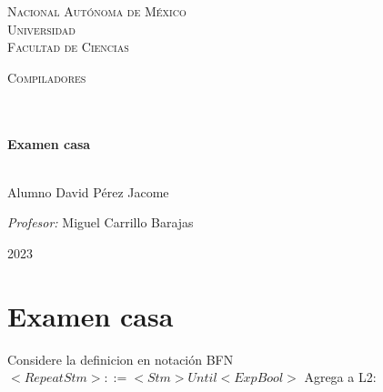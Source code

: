 \documentclass[14pt]{book}
\begin{document}
\begin{center}
\begin{minipage}{0.48\textwidth}
\begin{flushright}
    \end{flushright}
  \end{minipage}
  \vspace*{-1.5cm}
  \textsc{\huge Nacional Autónoma de México \\ \vspace{-4px} Universidad }\\[2cm]
  \textsc{\LARGE Facultad de Ciencias}\\[1.5cm]
  \begin{minipage}{0.9\textwidth}
    \begin{center}
      \textsc{\LARGE Compiladores}
    \end{center}
  \end{minipage}\\[0.5cm]
  \vspace*{1cm}
  \HRule \\[0.4cm]
  { \huge \bfseries Examen casa}\\[0.4cm]
  \HRule \\[1.5cm]
  \begin{minipage}{0.52\textwidth}
    \begin{flushleft} \large \small \vspace{-0.6cm} \vspace{-0.6cm}
      Alumno David Pérez Jacome \\
    \end{flushleft}
  \end{minipage}
  \begin{minipage}{0.46\textwidth}
    \vspace{-0.6cm}
    \begin{flushright} \large \small \emph{Profesor:}
      Miguel Carrillo Barajas \\
    \end{flushright}
  \end{minipage}
  \vspace*{1cm}
  \vspace{2cm}
  \begin{center}
    {\large 2023}
  \end{center}
\end{center}
\newpage

{\color{blue} \section*{\textbf{Examen casa}}}
\vspace{1em}

Considere la definicion en notación BFN $<RepeatStm>::=<Stm> Until<ExpBool>$ Agrega a L2:\\
\end{document}
